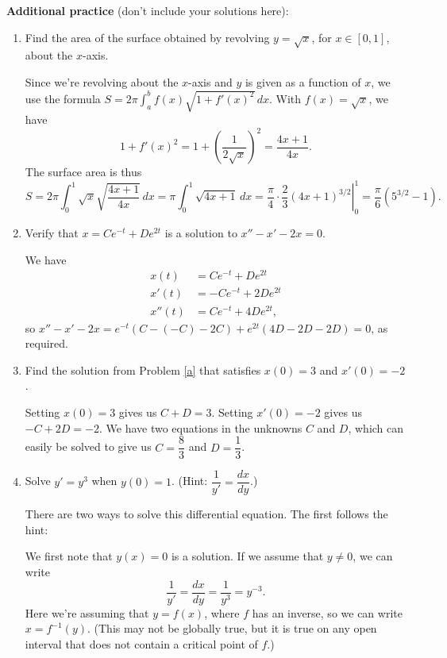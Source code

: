 \documentclass[12pt]{article}
\begin{document}
\textbf{Additional practice} (don't include your solutions here):
\begin{enumerate}
  \item Find the area of the surface obtained by revolving $y=\sqrt{x}$, for $x\in [0,1]$, about the $x$-axis.

\medskip

Since we're revolving about the $x$-axis and $y$ is given as a function of $x$, we use the formula $S = 2\pi \int_a^b f(x)\sqrt{1+f'(x)^2}\,dx$. With $f(x)=\sqrt{x}$, we have
\[
 1+f'(x)^2 = 1+\left(\frac{1}{2\sqrt{x}}\right)^2 = \frac{4x+1}{4x}.
\]
The surface area is thus
\[
 S = 2\pi \int_0^1 \sqrt{x}\sqrt{\frac{4x+1}{4x}}\,dx = \pi\int_0^1 \sqrt{4x+1}\,dx = \left.\frac{\pi}{4}\cdot\frac{2}{3}(4x+1)^{3/2}\right|_0^1 = \frac{\pi}{6}(5^{3/2}-1).
\]

 \item Verify that $x=Ce^{-t}+De^{2t}$ is a solution to $x''-x'-2x=0$.\label{a}
 
 \bigskip

We have
\begin{align*}
 x(t) & = Ce^{-t}+De^{2t}\\
 x'(t) & = -Ce^{-t}+2De^{2t}\\
 x''(t) & = Ce^{-t}+4De^{2t},
\end{align*}
so $x''-x'-2x = e^{-t}(C-(-C)-2C)+e^{2t}(4D-2D-2D) = 0$, as required.

 \item Find the solution from Problem \ref{a} that satisfies $x(0)=3$ and $x'(0)=-2$.
 
 \bigskip

Setting $x(0)=3$ gives us $C+D=3$. Setting $x'(0)=-2$ gives us $-C+2D=-2$. We have two equations in the unknowns $C$ and $D$, which can easily be solved to give us $C=\dfrac{8}{3}$ and $D=\dfrac{1}{3}$.

\item Solve $y'=y^3$ when $y(0)=1$. (Hint: $\dfrac{1}{y'} = \dfrac{dx}{dy}$.)
 
 \bigskip

There are two ways to solve this differential equation. The first follows the hint: 

We first note that $y(x)=0$ is a solution. If we assume that $y\neq 0$, we can write
\[
 \frac{1}{y'} = \frac{dx}{dy} = \frac{1}{y^3} = y^{-3}.
\]
Here we're assuming that $y=f(x)$, where $f$ has an inverse, so we can write $x=f^{-1}(y)$. (This may not be globally true, but it is true on any open interval that does not contain a critical point of $f$.)


\end{enumerate}
\end{document}
